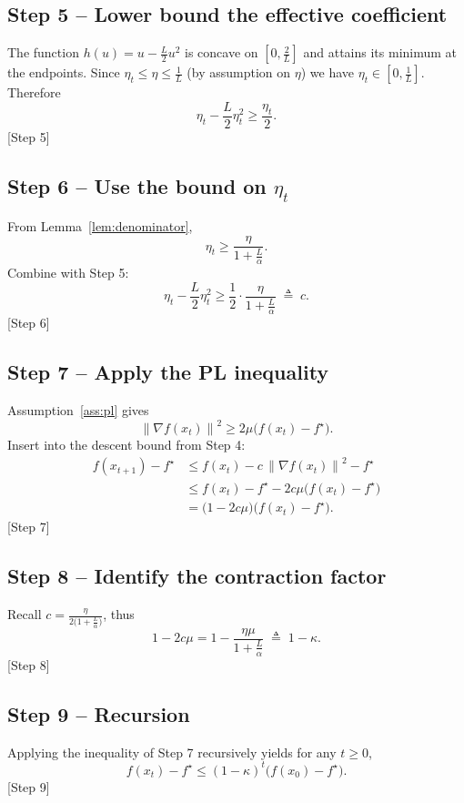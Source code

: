 \documentclass{article}
\newcommand{\norm}[1]{\left\|#1\right\|}
\newcommand{\grad}{\nabla}
\begin{document}
\subsection*{Step 5 – Lower bound the effective coefficient}
The function $h(u)=u-\frac{L}{2}u^{2}$ is concave on $[0,\frac{2}{L}]$ and attains its minimum at the endpoints. Since $\eta_t\le\eta\le\frac{1}{L}$ (by assumption on $\eta$) we have $\eta_t\in[0,\frac{1}{L}]$. Therefore
\[
    \eta_t-\frac{L}{2}\eta_t^{2} \ge \frac{\eta_t}{2}.
\]
[Step 5]

\subsection*{Step 6 – Use the bound on $\eta_t$}
From Lemma~\ref{lem:denominator},
\[
    \eta_t \ge \frac{\eta}{1+\frac{L}{\alpha}}.
\]
Combine with Step 5:
\[
    \eta_t-\frac{L}{2}\eta_t^{2} \ge \frac{1}{2}\cdot\frac{\eta}{1+\frac{L}{\alpha}}
    \; \triangleq\; c .
\]
[Step 6]

\subsection*{Step 7 – Apply the PL inequality}
Assumption~\ref{ass:pl} gives
\[
    \norm{\grad f(x_t)}^{2}\ge 2\mu\bigl(f(x_t)-f^{\star}\bigr).
\]
Insert into the descent bound from Step 4:
\[
\begin{aligned}
    f(x_{t+1}) - f^{\star}
    &\le f(x_t)-c\,\norm{\grad f(x_t)}^{2} - f^{\star}\\
    &\le f(x_t)-f^{\star} - 2c\mu\bigl(f(x_t)-f^{\star}\bigr)\\
    &= \bigl(1-2c\mu\bigr)\bigl(f(x_t)-f^{\star}\bigr).
\end{aligned}
\]
[Step 7]

\subsection*{Step 8 – Identify the contraction factor}
Recall $c=\frac{\eta}{2\bigl(1+\frac{L}{\alpha}\bigr)}$, thus
\[
    1-2c\mu = 1-\frac{\eta\mu}{1+\frac{L}{\alpha}}
    \;\triangleq\; 1-\kappa .
\]
[Step 8]

\subsection*{Step 9 – Recursion}
Applying the inequality of Step 7 recursively yields for any $t\ge 0$,
\[
    f(x_{t})-f^{\star}\le (1-\kappa)^{t}\bigl(f(x_{0})-f^{\star}\bigr).
\]
[Step 9]
\end{document}
